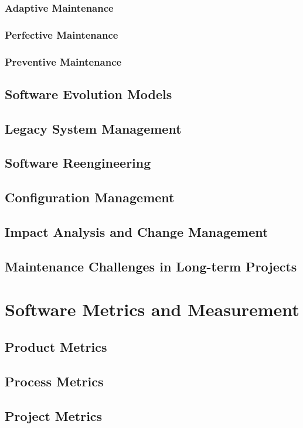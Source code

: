 \subsubsection{Adaptive Maintenance}
\subsubsection{Perfective Maintenance}
\subsubsection{Preventive Maintenance}
\subsection{Software Evolution Models}
\subsection{Legacy System Management}
\subsection{Software Reengineering}
\subsection{Configuration Management}
\subsection{Impact Analysis and Change Management}
\subsection{Maintenance Challenges in Long-term Projects}

\newpage

\section{Software Metrics and Measurement}
\subsection{Product Metrics}
\subsection{Process Metrics}
\subsection{Project Metrics}
